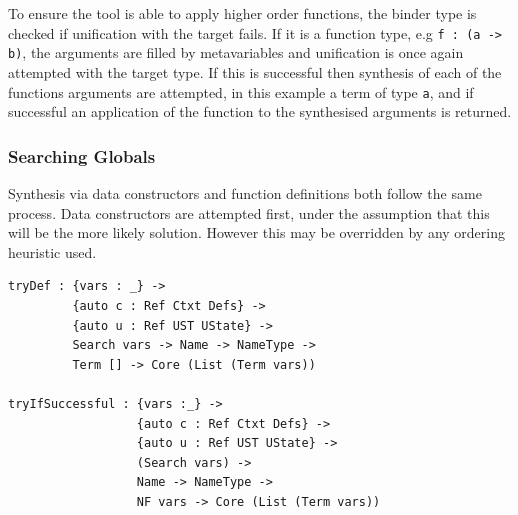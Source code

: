 \documentclass[a4paper]{article}
\begin{document}
To ensure the tool is able to apply higher order functions, the binder type is checked if
unification with the target fails. If it is a function type, e.g \texttt{f : (a -> b)}, the
arguments are filled by metavariables and unification is once again
attempted with the target type. If this is successful then synthesis of each of the functions
arguments are attempted, in this example a term of type \texttt{a},
and if successful an application of the function to the synthesised arguments is returned. 


\subsubsection{Searching Globals}
\label{sec:org8039f5d}

Synthesis via data constructors and function definitions
both follow the same process. Data constructors are attempted
first, under the assumption that this will be the more likely solution.
However this may be overridden by any ordering heuristic used.

\begin{center}
\begin{verbatim}
tryDef : {vars : _} ->
		 {auto c : Ref Ctxt Defs} -> 
		 {auto u : Ref UST UState} ->
		 Search vars -> Name -> NameType ->
		 Term [] -> Core (List (Term vars))

tryIfSuccessful : {vars :_} ->
				  {auto c : Ref Ctxt Defs} ->
				  {auto u : Ref UST UState} ->
				  (Search vars) ->
				  Name -> NameType ->
				  NF vars -> Core (List (Term vars))
\end{verbatim}
\end{center}
\end{document}

